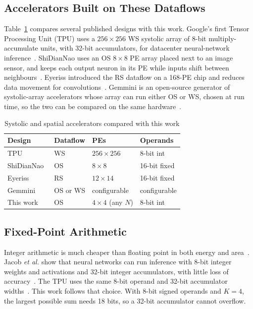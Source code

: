 \subsection{Accelerators Built on These Dataflows}
Table~\ref{tab:litcompare} compares several published designs with this work. Google's first Tensor Processing Unit (TPU) uses a $256 \times 256$ WS systolic array of 8-bit multiply-accumulate units, with 32-bit accumulators, for datacenter neural-network inference~\cite{jouppi2017tpu}. ShiDianNao uses an OS $8 \times 8$ PE array placed next to an image sensor, and keeps each output neuron in its PE while inputs shift between neighbours~\cite{du2015shidiannao}. Eyeriss introduced the RS dataflow on a 168-PE chip and reduces data movement for convolutions~\cite{chen2016eyeriss, chen2017eyerissjssc}. Gemmini is an open-source generator of systolic-array accelerators whose array can run either OS or WS, chosen at run time, so the two can be compared on the same hardware~\cite{genc2021gemmini}.

\begin{table}[t]
\centering
\caption{Systolic and spatial accelerators compared with this work}
\label{tab:litcompare}
\footnotesize
\setlength{\tabcolsep}{4pt}
\begin{tabular}{@{}llll@{}}
\toprule
Design & Dataflow & PEs & Operands \\
\midrule
TPU~\cite{jouppi2017tpu} & WS & $256 \times 256$ & 8-bit int \\
ShiDianNao~\cite{du2015shidiannao} & OS & $8 \times 8$ & 16-bit fixed \\
Eyeriss~\cite{chen2017eyerissjssc} & RS & $12 \times 14$ & 16-bit fixed \\
Gemmini~\cite{genc2021gemmini} & OS or WS & configurable & configurable \\
This work & OS & $4 \times 4$ (any $N$) & 8-bit int \\
\bottomrule
\end{tabular}
\end{table}

\subsection{Fixed-Point Arithmetic}
Integer arithmetic is much cheaper than floating point in both energy and area~\cite{horowitz2014energy}. Jacob \emph{et al.} show that neural networks can run inference with 8-bit integer weights and activations and 32-bit integer accumulators, with little loss of accuracy~\cite{jacob2018quantization}. The TPU uses the same 8-bit operand and 32-bit accumulator widths~\cite{jouppi2017tpu}. This work follows that choice. With 8-bit signed operands and $K = 4$, the largest possible sum needs 18 bits, so a 32-bit accumulator cannot overflow.

